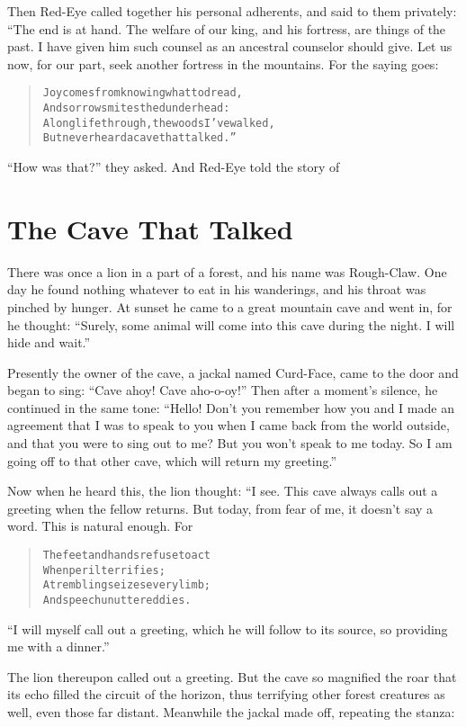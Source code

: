 \documentclass[article, twoside, 14pt]{memoir}
\renewenvironment{verbatim}{%
\begin{quote}%
\vskip -10pt%
\begin{alltt}\normalfont\large}{\end{alltt}%
\end{quote}%
\vskip -10pt
} %
\begin{document}
Then Red-Eye called together his personal adherents, and said to
them privately: “The end is at hand. The welfare of our king, and
his fortress, are things of the past. I have given him such counsel
as an ancestral counselor should give. Let us now, for our part,
seek another fortress in the mountains. For the saying goes:

\begin{verbatim}
Joy comes from knowing what to dread,
And sorrow smites the dunderhead:
A long life through, the woods I've walked,
But never heard a cave that talked.”
\end{verbatim}
``How was that?'' they asked. And Red-Eye told the story of

\chapter{The Cave That Talked}

\label{s62}

There was once a lion in a part of a forest, and his name was
Rough-Claw. One day he found nothing whatever to eat in his
wanderings, and his throat was pinched by hunger. At sunset he came
to a great mountain cave and went in, for he thought:
``Surely, some animal will come into this cave during the night. I will hide and wait.''

Presently the owner of the cave, a jackal named Curd-Face, came to
the door and began to sing: ``Cave ahoy! Cave aho-o-oy!'' Then
after a moment's silence, he continued in the same tone:
``Hello! Don't you remember how you and I made an agreement that I was to speak to you when I came back from the world outside, and that you were to sing out to me? But you won't speak to me today. So I am going off to that other cave, which will return my greeting.''

Now when he heard this, the lion thought: “I see. This cave always
calls out a greeting when the fellow returns. But today, from fear
of me, it doesn't say a word. This is natural enough. For

\begin{verbatim}
The feet and hands refuse to act
    When peril terrifies;
A trembling seizes every limb;
    And speech unuttered dies.
\end{verbatim}
``I will myself call out a greeting, which he will follow to its source, so providing me with a dinner.''

The lion thereupon called out a greeting. But the cave so
magnified the roar that its echo filled the circuit of the horizon,
thus terrifying other forest creatures as well, even those far
distant. Meanwhile the jackal made off, repeating the stanza:
\end{document}
